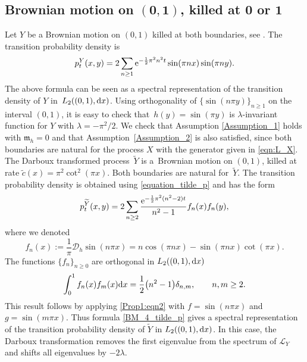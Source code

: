 \documentclass[pdftex]{sigma}
\numberwithin{equation}{section}
\theoremstyle{definition}
\def\L{{\mathcal L}}
\def\d{{\textnormal d}}
\begin{document}
\subsection[Brownian motion on (0,1), killed at 0 or 1]{Brownian motion on $\boldsymbol{(0,1)}$, killed at $\boldsymbol{0}$ or $\boldsymbol{1}$}\label{example4}


Let $Y$ be a Brownian motion on $(0,1)$ killed at both boundaries, see \cite[p.\ 122]{Borodin2002}. The transition probability density is
\[
p^Y_t(x,y)=2\sum\limits_{n\ge 1} {\rm e}^{-\frac{1}{2} \pi^2 n^2 t}
\sin(\pi n x) \sin(\pi n y).
\]
The above formula can be seen as a spectral representation of the transition density of $Y$ in~$L_2((0,1),\d x)$. Using orthogonality of $\{\sin(n \pi y)\}_{n\ge 1}$ on the interval $(0,1)$, it is easy to check that~${h(y)=\sin(\pi y)}$ is $\lambda$-invariant function for $Y$ with $\lambda=-\pi^2/2$. We check that Assumption \ref{Assumption_1} holds with ${\mathfrak m}_h=0$ and that Assumption~\ref{Assumption_2} is also satisfied, since both boundaries are natural for the process $X$ with the generator given in \eqref{eqn:L_X}. The Darboux transformed process~$\widetilde Y$ is a~Brownian motion on $(0,1)$, killed at rate
$\tilde c(x)= \pi^2 \cot^{2} (\pi x)$. Both boundaries are natural for~$\widetilde Y$. The transition probability density is obtained using \eqref{equation_tilde_p} and has the form
\begin{equation}\label{BM_4_tilde_p}
p^{\widetilde Y}_t(x,y)=2\sum\limits_{n\ge 2} \frac{{\rm e}^{-\frac{1}{2} \pi^2 ( n^2-2) t} }{n^2-1} f_n(x) f_n(y),
\end{equation}
where we denoted
\[
f_n(x):=\frac{1}{\pi} {\mathcal D}_h \sin(n \pi x)=n \cos(\pi n x)- \sin(\pi n x) \cot(\pi x).
\]
The functions $\{f_n\}_{n\ge 0}$ are orthogonal in $L_2((0,1),\d x)$
\[
\int_0^1 f_n(x) f_m(x) \d x=\frac{1}{2} \bigl(n^2-1\bigr) \delta_{n,m}, \qquad n,m\ge 2.
\]
This result follows by applying \eqref{Prop1:eqn2} with $f=\sin(n \pi x)$ and $g=\sin(m \pi x)$. Thus formula \eqref{BM_4_tilde_p} gives a spectral representation of the transition probability density of $\widetilde Y$ in $L_2((0,1),\d x)$. In this case, the Darboux transformation removes the first eigenvalue from the spectrum of $\L_Y$ and shifts all eigenvalues by $-2 \lambda$.
\end{document}

